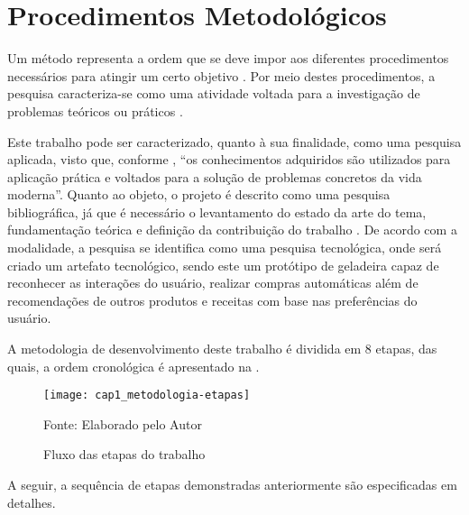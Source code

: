 \section{Procedimentos Metodológicos}

Um método representa a ordem que se deve impor aos diferentes procedimentos necessários para atingir um certo objetivo \cite{Cervo2007}. Por meio destes procedimentos, a pesquisa caracteriza-se como uma atividade voltada para a investigação de problemas teóricos ou práticos \cite{Matias-Pereira2012}.

Este trabalho pode ser caracterizado, quanto à sua finalidade, como uma pesquisa aplicada, visto que, conforme , ``os conhecimentos adquiridos são utilizados para aplicação prática e voltados para a solução de problemas concretos da vida moderna''. Quanto ao objeto, o projeto é descrito como uma pesquisa bibliográfica, já que é necessário o levantamento do estado da arte do tema, fundamentação teórica e definição da contribuição do trabalho \cite{Matias-Pereira2012}. De acordo com a modalidade, a pesquisa se identifica como uma pesquisa tecnológica, onde será criado um artefato tecnológico, sendo este um protótipo de geladeira capaz de reconhecer as interações do usuário, realizar compras automáticas além de recomendações de outros produtos e receitas com base nas preferências do usuário. 

A metodologia de desenvolvimento deste trabalho é dividida em 8 etapas, das quais, a ordem cronológica é apresentado na .

\begin{figure}[htb]
    \caption{Fluxo das etapas do trabalho}
    \texttt{[image: cap1\_metodologia-etapas]}
    \label{fig:cap1_metodologia-etapas}
    
    \footnotesize{Fonte: Elaborado pelo Autor}
\end{figure}

A seguir, a sequência de etapas demonstradas anteriormente são especificadas em detalhes.

